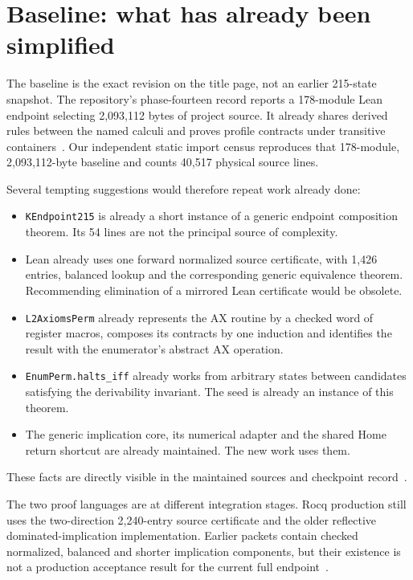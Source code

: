 \documentclass[11pt]{article}
\theoremstyle{definition}\newtheorem{definition}[theorem]{Definition}
\newcommand{\code}[1]{\texttt{#1}}
\begin{document}
\section{Baseline: what has already been simplified}

The baseline is the exact revision on the title page, not an earlier 215-state
snapshot. The repository's phase-fourteen record reports a 178-module Lean
endpoint selecting 2,093,112 bytes of project source. It already shares derived
rules between the named calculi and proves profile contracts under transitive
containers~\cite{phase14}. Our independent static import census reproduces that
178-module, 2,093,112-byte baseline and counts 40,517 physical source lines.

Several tempting suggestions would therefore repeat work already done:
\begin{itemize}
\item \code{KEndpoint215} is already a short instance of a generic endpoint
composition theorem. Its 54 lines are not the principal source of complexity.
\item Lean already uses one forward normalized source certificate, with 1,426
entries, balanced lookup and the corresponding generic equivalence theorem.
Recommending elimination of a mirrored Lean certificate would be obsolete.
\item \code{L2AxiomsPerm} already represents the AX routine by a checked word
of register macros, composes its contracts by one induction and identifies the
result with the enumerator's abstract AX operation.
\item \code{EnumPerm.halts\_iff} already works from arbitrary states between
candidates satisfying the derivability invariant. The seed is already an
instance of this theorem.
\item The generic implication core, its numerical adapter and the shared Home
return shortcut are already maintained. The new work uses them.
\end{itemize}
These facts are directly visible in the maintained sources and checkpoint
record~\cite{endpoint,enum,axioms,phase14}.

The two proof languages are at different integration stages. Rocq production
still uses the two-direction 2,240-entry source certificate and the older
reflective dominated-implication implementation. Earlier packets contain checked
normalized, balanced and shorter implication components, but their existence is
not a production acceptance result for the current full endpoint~\cite{rocqsource,priorindex}.
\end{document}
